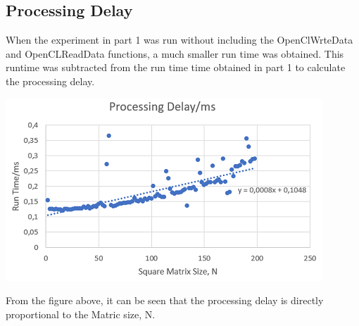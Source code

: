 \subsection{Processing Delay}
When the experiment in part 1 was run without including the OpenClWrteData and OpenCLReadData functions, a much smaller run time was obtained. This runtime was subtracted from the run time time obtained in part 1 to calculate the processing delay. 

\vspace{2mm}
\includegraphics{Figures/processing_delay.PNG}

From the figure above, it can be seen that the processing delay is directly proportional to the Matric size, N.
\\

\vspace{2mm}